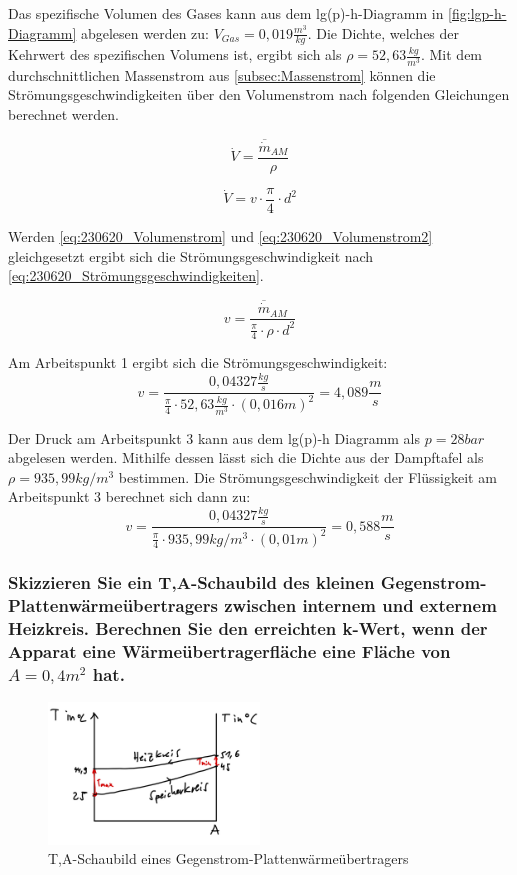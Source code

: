 Das spezifische Volumen des Gases kann aus dem lg(p)-h-Diagramm in \autoref{fig:lgp-h-Diagramm} abgelesen werden zu: $V_{Gas}=0,019 \frac{m^3}{kg}$. Die Dichte, welches der Kehrwert des spezifischen Volumens ist, ergibt sich als $\rho=52,63 \frac{kg}{m^3}$. 
Mit dem durchschnittlichen Massenstrom aus \autoref{subsec:Massenstrom} können die Strömungsgeschwindigkeiten über den Volumenstrom nach folgenden Gleichungen berechnet werden.

\begin{equation}
    \dot{V}= \frac{\overline{\dot m}_{AM}}{\rho }
    \label{eq:230620_Volumenstrom}
\end{equation}

\begin{equation}
    \dot{V}= v \cdot \frac{\pi}{4} \cdot d^2
    \label{eq:230620_Volumenstrom2}
\end{equation}

Werden \autoref{eq:230620_Volumenstrom} und \autoref{eq:230620_Volumenstrom2} gleichgesetzt ergibt sich die Strömungsgeschwindigkeit nach \autoref{eq:230620_Strömungsgeschwindigkeiten}.

\begin{equation}
    v = \frac{\overline{\dot m}_{AM}}{\frac{\pi}{4}\cdot \rho \cdot d^2}
    \label{eq:230620_Strömungsgeschwindigkeiten}
\end{equation}

Am Arbeitspunkt 1 ergibt sich die Strömungsgeschwindigkeit:
$$v=\frac{0,04327 \frac{kg}{s}}{\frac{\pi}{4}\cdot 52,63 \frac{kg}{m^3} \cdot (0,016 m)^2}=4,089 \frac{m}{s} $$

Der Druck am Arbeitspunkt 3 kann aus dem lg(p)-h Diagramm als $p=28 bar$ abgelesen werden. Mithilfe dessen lässt sich die Dichte aus der Dampftafel als $\rho=935,99 kg/m^3$ bestimmen.
Die Strömungsgeschwindigkeit der Flüssigkeit am Arbeitspunkt 3 berechnet sich dann zu:
$$v=\frac{0,04327 \frac{kg}{s}}{\frac{\pi}{4}\cdot 935,99 kg/m^3 \cdot (0,01 m)^2}=0,588 \frac{m}{s} $$

\subsubsection{Skizzieren Sie ein T,A-Schaubild des kleinen Gegenstrom-Plattenwärmeübertragers
zwischen internem und externem Heizkreis. Berechnen Sie den erreichten k-Wert,
wenn der Apparat eine Wärmeübertragerfläche eine Fläche von \texorpdfstring{$A = 0,4 m^2$}{} hat.}

\begin{figure}[!ht]
    \centering
    \includegraphics[width=0.5\textwidth]{Abbildungen/TA.Diagramm.jpeg}
    \caption{T,A-Schaubild eines Gegenstrom-Plattenwärmeübertragers}
    \label{fig:TA,Diagramm}
\end{figure}

